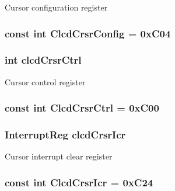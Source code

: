 \label{classPl111_a60838816fc4cc7e898042259f9eec917}
Cursor configuration register \hypertarget{classPl111_af3d614306a1e372b77b025635dbc46e2}{
\subsubsection[{ClcdCrsrConfig}]{\setlength{\rightskip}{0pt plus 5cm}const int {\bf ClcdCrsrConfig} = 0xC04}}
\label{classPl111_af3d614306a1e372b77b025635dbc46e2}
\hypertarget{classPl111_af1aa35ccaa11f11271ede1e39c64c3ad}{
\subsubsection[{clcdCrsrCtrl}]{\setlength{\rightskip}{0pt plus 5cm}int {\bf clcdCrsrCtrl}}}
\label{classPl111_af1aa35ccaa11f11271ede1e39c64c3ad}
Cursor control register \hypertarget{classPl111_a026d609da822510f1c3fcc469ed4ba44}{
\subsubsection[{ClcdCrsrCtrl}]{\setlength{\rightskip}{0pt plus 5cm}const int {\bf ClcdCrsrCtrl} = 0xC00}}
\label{classPl111_a026d609da822510f1c3fcc469ed4ba44}
\hypertarget{classPl111_a29b7b61cdbcee532d282c29504a725c8}{
\subsubsection[{clcdCrsrIcr}]{\setlength{\rightskip}{0pt plus 5cm}InterruptReg {\bf clcdCrsrIcr}}}
\label{classPl111_a29b7b61cdbcee532d282c29504a725c8}
Cursor interrupt clear register \hypertarget{classPl111_a1fb557456a3039ce3d0491fe253bfaa6}{
\subsubsection[{ClcdCrsrIcr}]{\setlength{\rightskip}{0pt plus 5cm}const int {\bf ClcdCrsrIcr} = 0xC24}}
